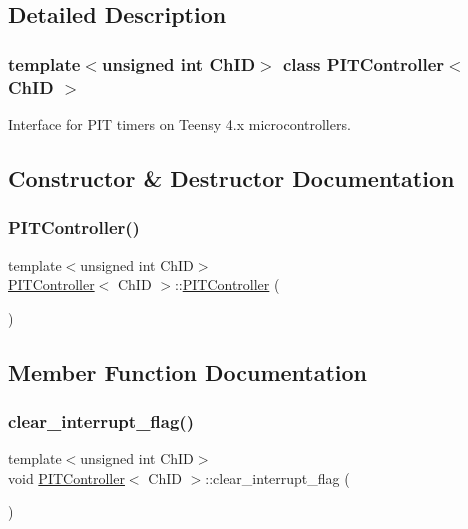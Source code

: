 \subsection{Detailed Description}
\subsubsection*{template$<$unsigned int Ch\+ID$>$\newline
class P\+I\+T\+Controller$<$ Ch\+I\+D $>$}

Interface for P\+IT timers on Teensy 4.\+x microcontrollers. 

\subsection{Constructor \& Destructor Documentation}
\mbox{\label{classPITController_ad9ef4f151495076fad7b0c556e48b117}} 
\subsubsection{\texorpdfstring{P\+I\+T\+Controller()}{PITController()}}
{\footnotesize\ttfamily template$<$unsigned int Ch\+ID$>$ \\
\hyperlink{classPITController}{P\+I\+T\+Controller}$<$ Ch\+ID $>$\+::\hyperlink{classPITController}{P\+I\+T\+Controller} (\begin{DoxyParamCaption}{ }\end{DoxyParamCaption})\hspace{0.3cm}{\ttfamily [inline]}}



\subsection{Member Function Documentation}
\mbox{\label{classPITController_ae3f9c981e88cced34153234475de5646}} 
\subsubsection{\texorpdfstring{clear\+\_\+interrupt\+\_\+flag()}{clear\_interrupt\_flag()}}
{\footnotesize\ttfamily template$<$unsigned int Ch\+ID$>$ \\
void \hyperlink{classPITController}{P\+I\+T\+Controller}$<$ Ch\+ID $>$\+::clear\+\_\+interrupt\+\_\+flag (\begin{DoxyParamCaption}{ }\end{DoxyParamCaption})\hspace{0.3cm}{\ttfamily [inline]}}



